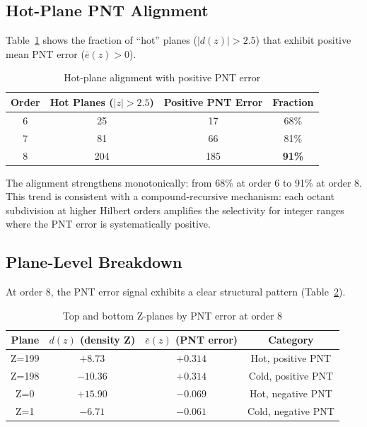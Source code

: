 \documentclass[11pt,a4paper]{article}
\begin{document}
\subsection{Hot-Plane PNT Alignment}

Table~\ref{tab:hot} shows the fraction of ``hot'' planes ($|d(z)| > 2.5$)
that exhibit positive mean PNT error ($\bar{e}(z) > 0$).

\begin{table}[h]
\centering
\caption{Hot-plane alignment with positive PNT error}
\label{tab:hot}
\begin{tabular}{cccc}
\toprule
Order & Hot Planes ($|z|>2.5$) & Positive PNT Error & Fraction \\
\midrule
6 & 25  & 17  & 68\% \\
7 & 81  & 66  & 81\% \\
8 & 204 & 185 & \textbf{91\%} \\
\bottomrule
\end{tabular}
\end{table}

The alignment strengthens monotonically: from 68\% at order 6 to 91\%
at order 8. This trend is consistent with a compound-recursive mechanism:
each octant subdivision at higher Hilbert orders amplifies the selectivity
for integer ranges where the PNT error is systematically positive.

\subsection{Plane-Level Breakdown}

At order 8, the PNT error signal exhibits a clear structural pattern
(Table~\ref{tab:planes}).

\begin{table}[h]
\centering
\caption{Top and bottom Z-planes by PNT error at order 8}
\label{tab:planes}
\begin{tabular}{cccc}
\toprule
Plane & $d(z)$ (density Z) & $\bar{e}(z)$ (PNT error) & Category \\
\midrule
Z=199 & $+8.73$  & $+0.314$ & Hot, positive PNT \\
Z=198 & $-10.36$ & $+0.314$ & Cold, positive PNT \\
Z=0   & $+15.90$ & $-0.069$ & Hot, negative PNT \\
Z=1   & $-6.71$  & $-0.061$ & Cold, negative PNT \\
\bottomrule
\end{tabular}
\end{table}
\end{document}
